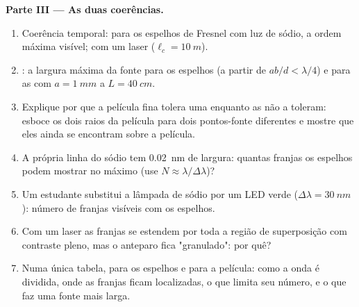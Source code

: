 \begin{problem}
\medskip
\noindent\textbf{Parte III --- As duas coerências.}
\begin{enumerate}[resume]
  \item Coerência temporal: para os espelhos de Fresnel com luz de sódio,
        a ordem máxima visível; com um laser ($\ell_c = \qty{10}{m}$).
  \item {}: a largura máxima da fonte para os espelhos
        (a partir de $ab/d < \lambda/4$) e para as  com $a = \qty{1}{mm}$ a
        $L = \qty{40}{cm}$.
  \item Explique por que a película fina tolera uma  enquanto
        as  não a toleram: esboce os dois raios da película para dois
        pontos-fonte diferentes e mostre que eles ainda se encontram sobre a película.
  \item A própria linha do sódio tem \qty{0.02}{nm} de largura: quantas franjas
        os espelhos podem mostrar no máximo (use $N \approx \lambda/\Delta\lambda$)?
  \item Um estudante substitui a lâmpada de sódio por um LED verde ($\Delta\lambda =
        \qty{30}{nm}$): número de franjas visíveis com os espelhos.
  \item Com um laser as franjas se estendem por toda a região de superposição
        com contraste pleno, mas o anteparo fica "granulado": por quê?
  \item Numa única tabela, para os espelhos e para a película: como a onda é
        dividida, onde as franjas ficam localizadas, o que limita seu
        número, e o que faz uma fonte mais larga.
\end{enumerate}
\end{problem}
